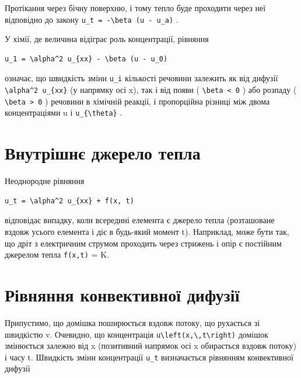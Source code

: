\documentclass[
  ukrainian,
]{article}
\begin{document}
Протікання через бічну поверхню, і тому тепло буде проходити через неї
відповідно до закону
\texttt{u\_t\ =\ -\textbackslash{}beta\ (u\ -\ u\_a)} .

У хімії, де величина відіграє роль концентрації, рівняння

\begin{verbatim}
u_1 = \alpha^2 u_{xx} - \beta (u - u_0)
\end{verbatim}

означає, що швидкість зміни \texttt{u\_i} кількості речовини залежить як
від дифузії \texttt{\textbackslash{}alpha\^{}2\ u\_\{xx\}} (у напрямку
осі x), так і від появи ( \texttt{\textbackslash{}beta\ \textless{}\ 0}
) або розпаду ( \texttt{\textbackslash{}beta\ \textgreater{}\ 0} )
речовини в хімічній реакції, і пропорційна різниці між двома
концентраціями u і \texttt{u\_\{\textbackslash{}theta\}} .

\section{Внутрішнє джерело
тепла}\label{ux432ux43dux443ux442ux440ux456ux448ux43dux454-ux434ux436ux435ux440ux435ux43bux43e-ux442ux435ux43fux43bux430}

Неоднородне рівняння

\begin{verbatim}
u_t = \alpha^2 u_{xx} + f(x, t)
\end{verbatim}

відповідає випадку, коли всередині елемента є джерело тепла (розташоване
вздовж усього елемента і діє в будь-який момент t). Наприклад, може бути
так, що дріт з електричним струмом проходить через стрижень і опір є
постійним джерелом тепла \texttt{f(x,t)} = K.

\section{Рівняння конвективної
дифузії}\label{ux440ux456ux432ux43dux44fux43dux43dux44f-ux43aux43eux43dux432ux435ux43aux442ux438ux432ux43dux43eux457-ux434ux438ux444ux443ux437ux456ux457}

Припустимо, що домішка поширюється вздовж потоку, що рухається зі
швидкістю v. Очевидно, що концентрація
\texttt{u\textbackslash{}left(x,\textbackslash{},t\textbackslash{}right)}
домішок змінюється залежно від x (позитивний напрямок осі x обирається
вздовж потоку) і часу t. Швидкість зміни концентрації \texttt{u\_t}
визначається рівнянням конвективної дифузії
\end{document}
